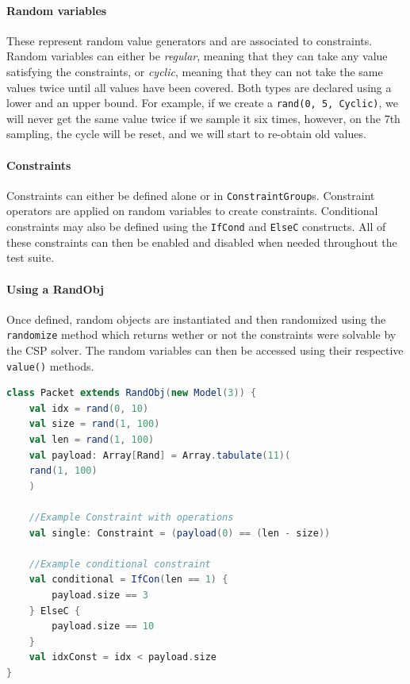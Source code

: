 \documentclass[conference]{IEEEtran}
\begin{document}
\paragraph{Random variables} These represent random value generators and are associated to constraints. 
Random variables can either be \textit{regular}, meaning that they can take any value satisfying the constraints, or \textit{cyclic}, meaning that they can not take the same values twice until all values have been covered.
Both types are declared using a lower and an upper bound. 
For example, if we create a \texttt{rand(0, 5, Cyclic)}, we will never get the same value twice if we sample it six times, however, on the 7th sampling, the cycle will be reset, and we will start to re-obtain old values.

\paragraph{Constraints} Constraints can either be defined alone or in \texttt{ConstraintGroup}s. 
Constraint operators are applied on random variables to create constraints.
Conditional constraints may also be defined using the \texttt{IfCond} and \texttt{ElseC} constructs. 
All of these constraints can then be enabled and disabled when needed throughout the test suite.

\paragraph{Using a RandObj} Once defined, random objects are instantiated and then randomized using the \texttt{randomize} method which returns wether or not the constraints were solvable by the CSP solver. 
The random variables can then be accessed using their respective \texttt{value()} methods.

\begin{lstlisting}[language=scala, caption={Usage of a random object. \texttt{rand(min, max, type=Normal)} is used to declare a random variable. Any operation on a random variable generates a constraint.}, label={lst:randobjscala}]    
class Packet extends RandObj(new Model(3)) {
    val idx = rand(0, 10)
    val size = rand(1, 100)
    val len = rand(1, 100)
    val payload: Array[Rand] = Array.tabulate(11)(
 	rand(1, 100)
    )

    //Example Constraint with operations
    val single: Constraint = (payload(0) == (len - size))
	
    //Example conditional constraint
    val conditional = IfCon(len == 1) {
        payload.size == 3
    } ElseC {
        payload.size == 10
    }
    val idxConst = idx < payload.size
}
\end{lstlisting}
\end{document}
